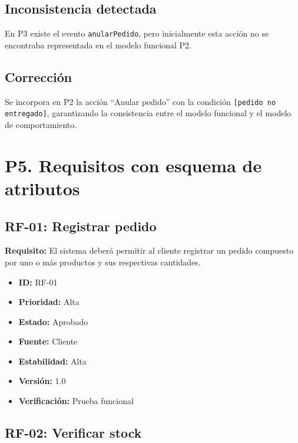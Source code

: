 \documentclass[12pt]{article}
\begin{document}
\subsection*{Inconsistencia detectada}

En P3 existe el evento \texttt{anularPedido}, pero inicialmente esta
acción no se encontraba representada en el modelo funcional P2.

\subsection*{Corrección}

Se incorpora en P2 la acción ``Anular pedido'' con la condición
\texttt{[pedido no entregado]}, garantizando la consistencia entre
el modelo funcional y el modelo de comportamiento.


\section*{P5. Requisitos con esquema de atributos}

\subsection*{RF-01: Registrar pedido}

\textbf{Requisito:} El sistema deberá permitir al cliente registrar
un pedido compuesto por uno o más productos y sus respectivas cantidades.

\begin{itemize}
    \item \textbf{ID:} RF-01
    \item \textbf{Prioridad:} Alta
    \item \textbf{Estado:} Aprobado
    \item \textbf{Fuente:} Cliente
    \item \textbf{Estabilidad:} Alta
    \item \textbf{Versión:} 1.0
    \item \textbf{Verificación:} Prueba funcional
\end{itemize}

\subsection*{RF-02: Verificar stock}
\end{document}
